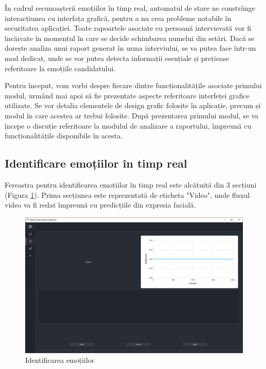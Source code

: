 \documentclass[a4paper, 12pt]{report}
\begin{document}
	În cadrul recunoașterii emoțiilor în timp real, automatul de stare ne constrânge interacțiunea cu interfața grafică, pentru a nu crea probleme notabile în securitatea aplicației. Toate rapoartele asociate cu persoană intervievată vor fi încărcate în momentul în care se decide schimbarea numelui din setări. Dacă se dorește analiza unui raport generat în urma interviului, se va putea face într-un mod dedicat, unde se vor putea detecta informații esențiale și prețioase referitoare la emoțiile candidatului.
	
	\bigskip
	Pentru început, vom vorbi despre fiecare dintre funcționalitățile asociate primului modul, urmând mai apoi să fie prezentate aspecte referitoare interfeței grafice utilizate. Se vor detalia elementele de design grafic folosite în aplicație, precum și modul în care acestea ar trebui folosite. După prezentarea primului modul, se va începe o discuție referitoare la modulul de analizare a raportului, împreună cu funcționalitățile disponibile în acesta.
	
	\clearpage
	\subsection{Identificare emoțiilor în timp real}
	Fereastra pentru identificarea emoțiilor în timp real este alcătuită din 3 secțiuni (Figura \ref{fig:emotion_recog_clean}). Prima secțiunea este reprezentată de eticheta "Video", unde fluxul video va fi redat împreună cu predicțiile din expresia facială.
	
	\begin{figure}[H]
		\begin{center}
			\includegraphics[scale=0.4]{images/emotion_recognition_clean.png}
		\end{center}
		\caption{Identificarea emoțiilor}
		\label{fig:emotion_recog_clean}
	\end{figure} 
	
\end{document}

